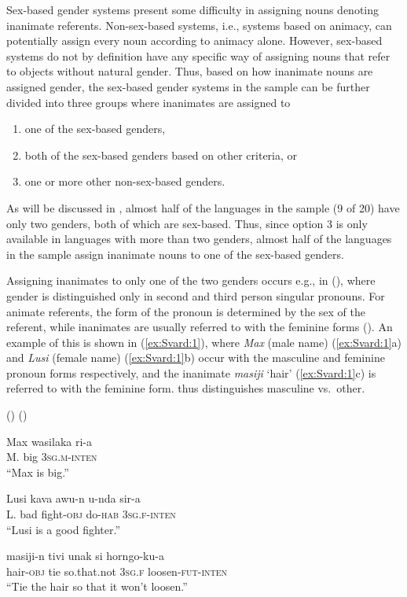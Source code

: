 \documentclass[output=collectionpaper]{langsci/langscibook}
\begin{document}
\largerpage
Sex-based gender systems present some difficulty in assigning nouns denoting inanimate referents. Non-sex-based systems, i.e., systems based on animacy, can potentially assign every noun according to animacy alone. However, sex-based systems do not by definition have any specific way of assigning nouns that refer to objects without natural gender. Thus, based on how inanimate nouns are assigned gender, the sex-based gender systems in the sample can be further divided into three groups where inanimates are assigned to

\begin{enumerate}
\item one of the sex-based genders,
\item both of the sex-based genders based on other criteria, or
\item one or more other non-sex-based genders.
\end{enumerate}
 

As will be discussed in , almost half of the languages in the sample (9 of 20) have only two genders, both of which are sex-based. Thus, since option 3 is only available in languages with more than two genders, almost half of the languages in the sample assign inanimate nouns to one of the sex-based genders.

  
Assigning inanimates to only one of the two genders occurs e.g., in  (), where gender is distinguished only in second and third person singular pronouns. For animate referents, the form of the pronoun is determined by the sex of the referent, while inanimates are usually referred to with the feminine forms (\citealt[17]{Hoel1994}). An example of this is shown in (\ref{ex:Svard:1}), where \textit{Max} (male name) (\ref{ex:Svard:1}a) and \textit{Lusi} (female name) (\ref{ex:Svard:1}b) occur with the masculine and feminine pronoun forms respectively, and the inanimate \textit{masiji} `hair' (\ref{ex:Svard:1}c) is referred to with the feminine form.  thus distinguishes masculine vs.\ other.

\ea
\label{ex:Svard:1}
 () (\citealt[19, 31, 46]{Hoel1994})\\
\begin{xlist}
\ex
\gll Max wasilaka ri-a\\
     M. big 3\textsc{sg.m-inten}\\
\glt ``Max is big.''

\ex
\gll Lusi kava awu-n u-nda sir-a\\
     L. {bad\footnotemark} fight\textsc{{}-obj} do\textsc{{}-hab} \textsc{3sg.f-inten}\\
\glt ``Lusi is a good fighter.''

\ex
\gll masiji-n tivi unak si horngo-ku-a\\
     hair-\textsc{obj} tie so.that.not 3\textsc{sg.f} loosen-\textsc{fut-inten}\\
\glt ``Tie the hair so that it won't loosen.''
\end{xlist}
\z
{}
\end{document}
